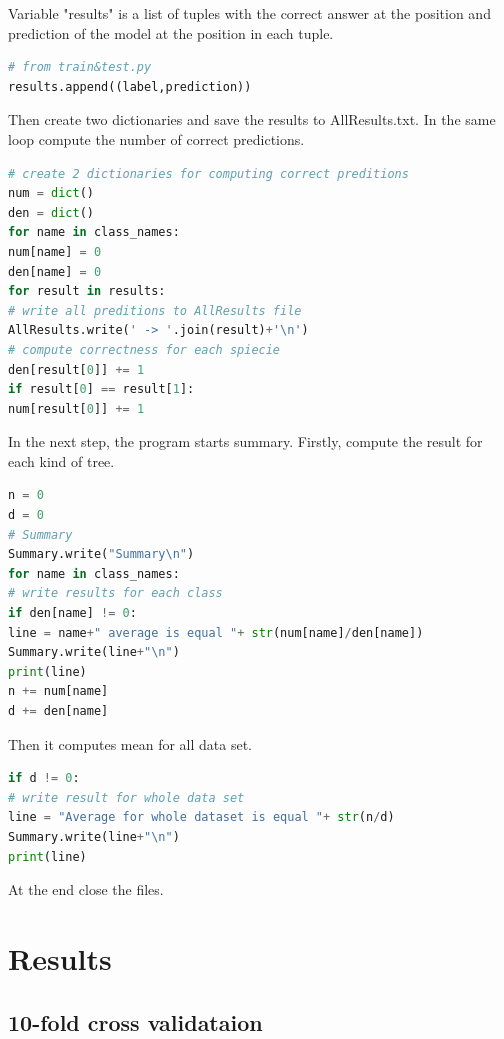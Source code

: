 \documentclass[12pt]{article}
\begin{document}
Variable "results" is a list of tuples with the correct answer at the  position and prediction of the model at the  position in each tuple.

\begin{lstlisting}[language=Python]
# from train&test.py
results.append((label,prediction))
\end{lstlisting}

Then create two dictionaries and save the results to AllResults.txt. In the same loop compute the number of correct predictions.

\begin{lstlisting}[language=Python]
# create 2 dictionaries for computing correct preditions
num = dict()
den = dict()
for name in class_names:
num[name] = 0
den[name] = 0
for result in results:
# write all preditions to AllResults file
AllResults.write(' -> '.join(result)+'\n')
# compute correctness for each spiecie
den[result[0]] += 1
if result[0] == result[1]:
num[result[0]] += 1
\end{lstlisting}

In the next step, the program starts summary. Firstly, compute the result for each kind of tree.

\begin{lstlisting}[language=Python]
n = 0
d = 0
# Summary
Summary.write("Summary\n")
for name in class_names:
# write results for each class
if den[name] != 0:
line = name+" average is equal "+ str(num[name]/den[name])
Summary.write(line+"\n")
print(line)
n += num[name]
d += den[name]
\end{lstlisting}

Then it computes mean for all data set.

\begin{lstlisting}[language=Python]
if d != 0:
# write result for whole data set
line = "Average for whole dataset is equal "+ str(n/d)
Summary.write(line+"\n")
print(line)
\end{lstlisting}

At the end close the files.

\newpage

\section{Results}

\subsection{10-fold cross validataion}
\end{document}
